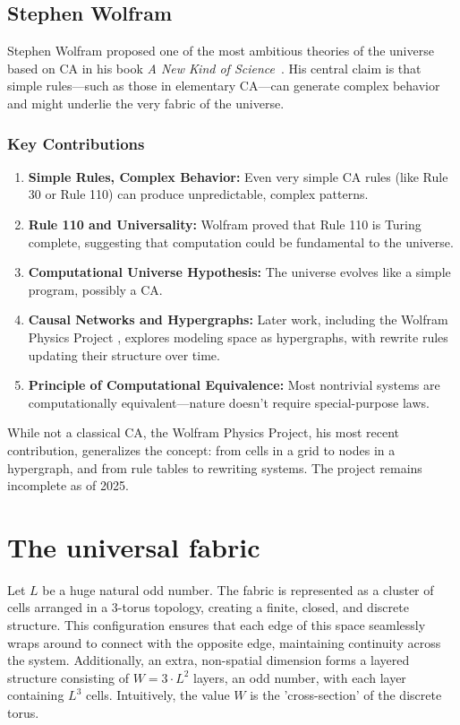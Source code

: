 \documentclass[12pt,english]{article}
\begin{document}
\subsection*{Stephen Wolfram}
Stephen Wolfram proposed one of the most ambitious theories of the universe based on CA in his book \emph{A New Kind of Science}~\cite{wolfram}. His central claim is that simple rules—such as those in elementary CA—can generate complex behavior and might underlie the very fabric of the universe.

\subsubsection*{Key Contributions}
\begin{enumerate}
  \item \textbf{Simple Rules, Complex Behavior:} Even very simple CA rules (like Rule 30 or Rule 110) can produce unpredictable, complex patterns.
  \item \textbf{Rule 110 and Universality:} Wolfram proved that Rule 110 is Turing complete, suggesting that computation could be fundamental to the universe.
  \item \textbf{Computational Universe Hypothesis:} The universe evolves like a simple program, possibly a CA.
  \item \textbf{Causal Networks and Hypergraphs:} Later work, including the Wolfram Physics Project \cite{wolfram2020physics}, explores modeling space as hypergraphs, with rewrite rules updating their structure over time.
  \item \textbf{Principle of Computational Equivalence:} Most nontrivial systems are computationally equivalent—nature doesn't require special-purpose laws.
\end{enumerate}

While not a classical CA, the Wolfram Physics Project, his most recent contribution, generalizes the concept: from cells in a grid to nodes in a hypergraph, and from rule tables to rewriting systems. The project remains incomplete as of 2025.

\section{The universal fabric \label{sec:space-and-time}}

Let \ensuremath{L} be a huge natural odd number. The fabric is represented as a cluster of cells arranged in a 3-torus topology, creating a finite, closed, and discrete structure. This configuration ensures that each edge of this space seamlessly wraps around to connect with the opposite edge, maintaining continuity across the system. Additionally, an extra, non-spatial dimension forms a layered structure consisting of $W=3\cdot L^2$ layers, an odd number, with each layer containing $L^{3}$ cells. Intuitively, the value $W$ is the 'cross-section' of the discrete torus.
\end{document}
